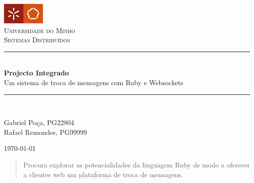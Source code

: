 \documentclass[12pt]{article} %
\begin{document}

\begin{titlepage}

  \newcommand{\HRule}{\rule{\linewidth}{0.5mm}} %

  \center %

  \includegraphics{logo}\\[1cm] %

  \textsc{\LARGE Universidade do Minho}\\[1.5cm] %
  \textsc{\Large Sistemas Distribuídos}\\[0.5cm] %

  \HRule \\[0.4cm]
  { \huge \bfseries Projecto Integrado}\\[0.1cm] %
  { \small Um sistema de troca de mensagens com Ruby e Websockets }
  \HRule \\[0.8cm]

  \begin{flushleft}
    Gabriel Poça, PG22804 \\
    Rafael Remondes, PG99999
  \end{flushleft}


  {\large \today}\\[3cm] %

  \begin{abstract}
    Procura explorar as potencialidades da linguagem Ruby de modo a oferecer
    a clientes web um plataforma de troca de mensagens.
  \end{abstract}


  \vfill %

\end{titlepage}
\end{document}
